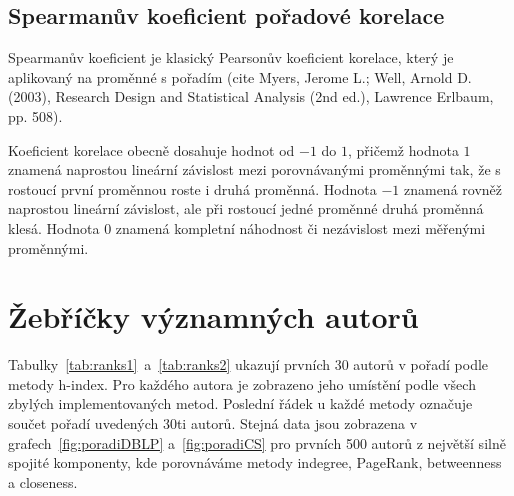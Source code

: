 \documentclass{bakalarka}
\begin{document}


\subsection{Spearmanův koeficient pořadové korelace}
Spearmanův koeficient je klasický Pearsonův koeficient korelace, který je
aplikovaný na proměnné s pořadím (cite Myers, Jerome L.; Well, Arnold D.
(2003), Research Design and Statistical Analysis (2nd ed.), Lawrence Erlbaum,
pp. 508).

Koeficient korelace obecně dosahuje hodnot od $-1$ do $1$, přičemž hodnota $1$
znamená naprostou lineární závislost mezi porovnávanými proměnnými tak, že s
rostoucí první proměnnou roste i druhá proměnná. Hodnota $-1$ znamená rovněž
naprostou lineární závislost, ale při rostoucí jedné proměnné druhá proměnná
klesá. Hodnota $0$ znamená kompletní náhodnost či nezávislost mezi měřenými
proměnnými.



\section{Žebříčky významných autorů}
Tabulky~\ref{tab:ranks1}~a~\ref{tab:ranks2} ukazují prvních 30 autorů v pořadí
podle metody h-index. Pro každého autora je zobrazeno jeho umístění podle všech
zbylých implementovaných metod. Poslední řádek u každé metody označuje součet
pořadí uvedených 30ti autorů. Stejná data jsou zobrazena v
grafech~\ref{fig:poradiDBLP} a~\ref{fig:poradiCS} pro prvních 500 autorů z
největší silně spojité komponenty, kde porovnáváme metody indegree, PageRank,
betweenness a closeness.
\end{document}
